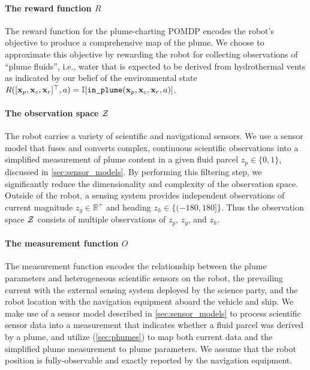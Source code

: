 \paragraph{The reward function $R$} The reward function for the plume-charting POMDP encodes the robot's objective to produce a comprehensive map of the plume. We choose to approximate this objective by rewarding the robot for collecting observations of ``plume fluids'', i.e., water that is expected to be derived from hydrothermal vents as indicated by our belief of the environmental state $R([\x_p, \x_c, \x_r]^\top, a) = \indic{\texttt{in\_plume}(\x_p, \x_c, \x_r, a)}$. 

\paragraph{The observation space $\mathcal{Z}$} The robot carries a variety of scientific and navigational sensors. We use a sensor model that fuses and converts complex, continuous scientific observations into a simplified measurement of plume content in a given fluid parcel $z_p \in \{0, 1\}$, discussed in \cref{sec:sensor_models}. By performing this filtering step, we significantly reduce the dimensionality and complexity of the observation space. Outside of the robot, a sensing system provides independent observations of current magnitude $z_g \in \mathbb{R}^+$ and heading $z_h \in \{(-180, 180]\}$. Thus the observation space $\mathcal{Z}$ consists of multiple observations of $z_p$, $z_g$, and $z_h$.

\paragraph{The measurement function $O$} The measurement function encodes the relationship between the plume parameters and heterogeneous scientific sensors on the robot, the prevailing current with the external sensing system deployed by the science party, and the robot location with the navigation equipment aboard the vehicle and ship. We make use of a sensor model described in \cref{sec:sensor_models} to process scientific sensor data into a measurement that indicates whether a fluid parcel was derived by a plume, and utilize \PHUMES (\cref{sec:phumes}) to map both current data and the simplified plume measurement to plume parameters. We assume that the robot position is fully-observable and exactly reported by the navigation equipment. 

